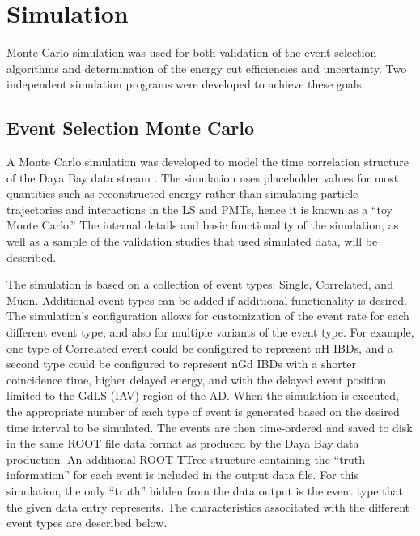 \chapter{Simulation}

Monte Carlo simulation was used for both validation of the event selection algorithms
and determination of the energy cut efficiencies and uncertainty.
Two independent simulation programs were developed to achieve these goals.

\section{Event Selection Monte Carlo}
\label{sec:toymc}

A Monte Carlo simulation was developed to model the time correlation structure
of the Daya Bay data stream \cite{dyb_toymc, dyb_toymc_docdb}.
The simulation uses placeholder values for most quantities such as reconstructed energy
rather than simulating particle trajectories and interactions in the LS and PMTs,
hence it is known as a ``toy Monte Carlo.''
The internal details and basic functionality of the simulation,
as well as a sample of the validation studies that used simulated data,
will be described.

The simulation is based on a collection of event types:
Single, Correlated, and Muon.
Additional event types can be added if additional functionality is desired.
The simulation's configuration allows for customization of the event rate
for each different event type,
and also for multiple variants of the event type.
For example, one type of Correlated event could be configured to represent nH IBDs,
and a second type could be configured to represent nGd IBDs
with a shorter coincidence time, higher delayed energy,
and with the delayed event position limited to the GdLS (IAV) region of the AD.
When the simulation is executed,
the appropriate number of each type of event is generated
based on the desired time interval to be simulated.
The events are then time-ordered
and saved to disk in the same ROOT file data format
as produced by the Daya Bay data production.
An additional ROOT TTree structure containing the ``truth information''
for each event is included in the output data file.
For this simulation, the only ``truth'' hidden from the data output
is the event type that the given data entry represents.
The characteristics associtated with the different event types
are described below.

